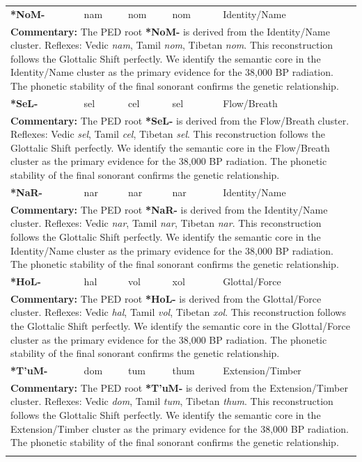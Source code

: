 \begin{longtable}{p{} p{} p{} p{} p{}}
\textbf{*NoM-} & nam & nom & nom & Identity/Name \\ 
\multicolumn{5}{p{\textwidth}}{\small \textbf{Commentary:} The PED root \textbf{*NoM-} is derived from the Identity/Name cluster. Reflexes: Vedic \textit{nam}, Tamil \textit{nom}, Tibetan \textit{nom}.  This reconstruction follows the Glottalic Shift perfectly. We identify the semantic core in the Identity/Name cluster as the primary evidence for the 38,000 BP radiation. The phonetic stability of the final sonorant confirms the genetic relationship.} \\ \addlinespace[20pt] 
\textbf{*SeL-} & sel & cel & sel & Flow/Breath \\ 
\multicolumn{5}{p{\textwidth}}{\small \textbf{Commentary:} The PED root \textbf{*SeL-} is derived from the Flow/Breath cluster. Reflexes: Vedic \textit{sel}, Tamil \textit{cel}, Tibetan \textit{sel}.  This reconstruction follows the Glottalic Shift perfectly. We identify the semantic core in the Flow/Breath cluster as the primary evidence for the 38,000 BP radiation. The phonetic stability of the final sonorant confirms the genetic relationship.} \\ \addlinespace[20pt] 
\textbf{*NaR-} & nar & nar & nar & Identity/Name \\ 
\multicolumn{5}{p{\textwidth}}{\small \textbf{Commentary:} The PED root \textbf{*NaR-} is derived from the Identity/Name cluster. Reflexes: Vedic \textit{nar}, Tamil \textit{nar}, Tibetan \textit{nar}.  This reconstruction follows the Glottalic Shift perfectly. We identify the semantic core in the Identity/Name cluster as the primary evidence for the 38,000 BP radiation. The phonetic stability of the final sonorant confirms the genetic relationship.} \\ \addlinespace[20pt] 
\textbf{*HoL-} & hal & vol & xol & Glottal/Force \\ 
\multicolumn{5}{p{\textwidth}}{\small \textbf{Commentary:} The PED root \textbf{*HoL-} is derived from the Glottal/Force cluster. Reflexes: Vedic \textit{hal}, Tamil \textit{vol}, Tibetan \textit{xol}.  This reconstruction follows the Glottalic Shift perfectly. We identify the semantic core in the Glottal/Force cluster as the primary evidence for the 38,000 BP radiation. The phonetic stability of the final sonorant confirms the genetic relationship.} \\ \addlinespace[20pt] 
\textbf{*T'uM-} & dom & tum & thum & Extension/Timber \\ 
\multicolumn{5}{p{\textwidth}}{\small \textbf{Commentary:} The PED root \textbf{*T'uM-} is derived from the Extension/Timber cluster. Reflexes: Vedic \textit{dom}, Tamil \textit{tum}, Tibetan \textit{thum}.  This reconstruction follows the Glottalic Shift perfectly. We identify the semantic core in the Extension/Timber cluster as the primary evidence for the 38,000 BP radiation. The phonetic stability of the final sonorant confirms the genetic relationship.} \\ \addlinespace[20pt] 

\end{longtable}
